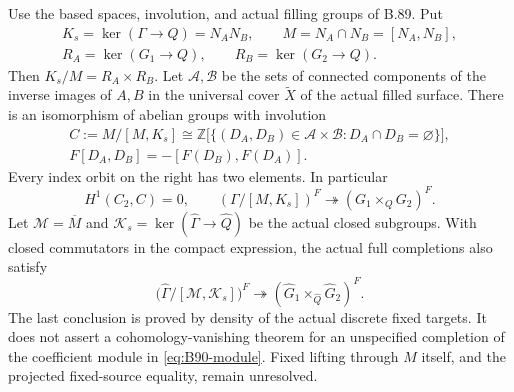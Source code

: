 \label{stmt:B90}
Use the based spaces, involution, and actual filling groups of B.89. Put
\[
 \begin{gathered}
 K_s=\ker(\Gamma\to Q)=N_A N_B,\qquad
 M=N_A\cap N_B=[N_A,N_B],\\
 R_A=\ker(G_1\to Q),\qquad R_B=\ker(G_2\to Q).
 \end{gathered}
\]
Then $K_s/M=R_A\times R_B$. Let $\mathscr A,\mathscr B$ be the
sets of connected components of the inverse images of $A,B$ in the
universal cover $\widetilde X$ of the actual filled surface. There is
an isomorphism of abelian groups with involution
\begin{equation}\label{eq:B90-module}
\begin{aligned}
 C:=M/[M,K_s]\cong
 \mathbb Z\bigl[\{(D_A,D_B)\in\mathscr A\times\mathscr B:
                         D_A\cap D_B=\varnothing\}\bigr],\\
 F[D_A,D_B]=-[F(D_B),F(D_A)].
\end{aligned}
\end{equation}
Every index orbit on the right has two elements. In particular
\begin{equation}\label{eq:B90-H1}
 H^1(C_2,C)=0,
 \qquad
 (\Gamma/[M,K_s])^F\twoheadrightarrow
                  (G_1\times_QG_2)^F.
\end{equation}
Let $\mathcal M=\overline M$ and
$\mathcal K_s=\ker(\widehat\Gamma\to\widehat Q)$ be the actual
closed subgroups. With closed commutators in the compact expression,
the actual full completions also satisfy
\begin{equation}\label{eq:B90-compact}
 \bigl(\widehat\Gamma/[\mathcal M,\mathcal K_s]\bigr)^F
       \twoheadrightarrow
       (\widehat G_1\times_{\widehat Q}\widehat G_2)^F.
\end{equation}
The last conclusion is proved by density of the actual discrete fixed
targets. It does not assert a cohomology-vanishing theorem for an
unspecified completion of the coefficient module in
\eqref{eq:B90-module}. Fixed lifting through $M$ itself, and the
projected fixed-source equality, remain unresolved.

